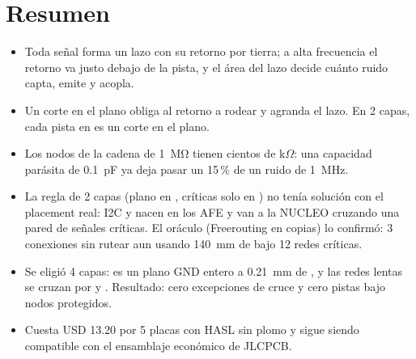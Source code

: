 \section*{Resumen}
\begin{itemize}
  \item Toda señal forma un lazo con su retorno por tierra; a alta frecuencia el retorno va justo debajo de la pista, y
  el área del lazo decide cuánto ruido capta, emite y acopla.
  \item Un corte en el plano obliga al retorno a rodear y agranda el lazo. En 2 capas, cada pista en  es un
  corte en el plano.
  \item Los nodos de la cadena de \SI{1}{\mega\ohm} tienen cientos de k$\Omega$: una capacidad parásita de
  \SI{0.1}{\pico\farad} ya deja pasar un 15\,\% de un ruido de \SI{1}{\mega\hertz}.
  \item La regla de 2 capas (plano en , críticas solo en ) no tenía solución con el placement
  real: I2C y  nacen en los AFE y van a la NUCLEO cruzando una pared de señales críticas. El oráculo
  (Freerouting en copias) lo confirmó: 3 conexiones sin rutear aun usando \SI{140}{\milli\meter} de  bajo
  12 redes críticas.
  \item Se eligió 4 capas:  es un plano GND entero a \SI{0.21}{\milli\meter} de , y las
  redes lentas se cruzan por  y . Resultado: cero excepciones de cruce y cero pistas bajo
  nodos protegidos.
  \item Cuesta USD \num{13.20} por 5 placas con HASL sin plomo y sigue siendo compatible con el ensamblaje económico de
  JLCPCB.
\end{itemize}
